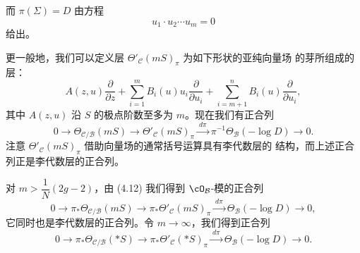 而 $\pi(\Sigma)=D$ 由方程
\[
  u_1\cdot u_2\cdots u_m=0
\]
给出。

更一般地，我们可以定义层 $\Theta'_\mathcal{C}(mS)_\pi$ 为如下形状的亚纯向量场
的芽所组成的层：
\[
  A(z,u)\frac{\partial}{\partial z}
  +\sum_{i=1}^mB_i(u)u_i\frac{\partial}{\partial u_i}
  +\sum_{i=m+1}^nB_i(u)\frac{\partial}{\partial u_i},
\]
其中 $A(z,u)$ 沿 $S$ 的极点阶数至多为 $m$。现在我们有正合列
\begin{equation}
  0\to\Theta_{\mathcal{C}/\mathcal{B}}(mS)
  \to\Theta'_\mathcal{C}(mS)_\pi\xrightarrow{\ d\pi\ }
  \pi^{-1}\Theta_\mathcal{B}(-\log D)\to 0 . \tag{4.12}
\end{equation}
注意 $\Theta'_\mathcal{C}(mS)_\pi$ 借助向量场的通常括号运算具有李代数层的
结构，而上述正合列正是李代数层的正合列。

对 $m>\dfrac{1}{N}(2g-2)$，由 (4.12) 我们得到 $\cO_\mathcal{B}$-模的正合列
\begin{equation}
  0\to\pi_*\Theta_{\mathcal{C}/\mathcal{B}}(mS)
  \to\pi_*\Theta'_\mathcal{C}(mS)_\pi\xrightarrow{\ d\pi\ }
  \Theta_\mathcal{B}(-\log D)\to 0 , \tag{4.13}
\end{equation}
它同时也是李代数层的正合列。令 $m\to\infty$，我们得到正合列
\begin{equation}
  0\to\pi_*\Theta_{\mathcal{C}/\mathcal{B}}(*S)
  \to\pi_*\Theta'_\mathcal{C}(*S)_\pi\xrightarrow{\ d\pi\ }
  \Theta_\mathcal{B}(-\log D)\to 0 . \tag{4.14}
\end{equation}

